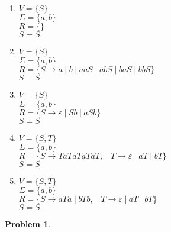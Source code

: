 \documentclass[11pt]{article}
\newcommand{\pipe}{\hspace{3pt}|\hspace{3pt}}
\theoremstyle{definition}
\theoremstyle{case}
\theoremstyle{theorem}
\newtheorem{prob}{Problem}
\begin{document}
\begin{enumerate}[label=(\alph*)]

\item
$V = \{S\}$ \\
$\Sigma = \{a, b\}$ \\
$R = \{\}$ \\
$S = S$

\item
$V = \{S\}$ \\
$\Sigma = \{a, b\}$ \\
$R = \{
S \rightarrow a \pipe b \pipe aaS \pipe abS \pipe baS \pipe bbS
\}$ \\
$S = S$

\item
$V = \{S\}$ \\
$\Sigma = \{a, b\}$ \\
$R = \{
S \rightarrow \varepsilon \pipe Sb \pipe aSb
\}$ \\
$S = S$

\item
$V = \{S, T\}$ \\
$\Sigma = \{a, b\}$ \\
$R = \{
S \rightarrow TaTaTaTaT, \hspace{10pt}
T \rightarrow \varepsilon \pipe aT \pipe bT 
\}$ \\
$S = S$

\item
$V = \{S, T\}$ \\
$\Sigma = \{a, b\}$ \\
$R = \{ 
S \rightarrow aTa \pipe bTb, \hspace{10pt}
T \rightarrow \varepsilon \pipe aT \pipe bT
\}$ \\
$S = S$

\end{enumerate}

\begin{prob}\end{prob}
\end{document}
